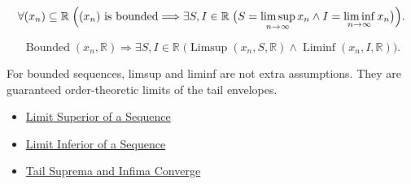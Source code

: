 \begin{remark*}
\[
\forall (x_n)\subseteq\mathbb{R}\;
\Bigl(
  (x_n)\text{ is bounded}
  \Longrightarrow
  \exists S,I\in\mathbb{R}\;
  \bigl(S=\limsup_{n\to\infty}x_n
  \land I=\liminf_{n\to\infty}x_n\bigr)
\Bigr).
\]
\end{remark*}

\begin{remark*}
\[
\operatorname{Bounded}(x_n,\mathbb{R})
\Longrightarrow
\exists S,I\in\mathbb{R}\;
\bigl(
  \operatorname{Limsup}(x_n,S,\mathbb{R})
  \land
  \operatorname{Liminf}(x_n,I,\mathbb{R})
\bigr).
\]
\end{remark*}

\begin{remark*}[Interpretation]
For bounded sequences, limsup and liminf are not extra assumptions. They are
guaranteed order-theoretic limits of the tail envelopes.
\end{remark*}

\begin{dependencies}
\begin{itemize}
  \item \hyperref[def:limsup-sequence]{Limit Superior of a Sequence}
  \item \hyperref[def:liminf-sequence]{Limit Inferior of a Sequence}
  \item \hyperref[thm:tail-suprema-infima-converge]{Tail Suprema and Infima Converge}
\end{itemize}
\end{dependencies}
